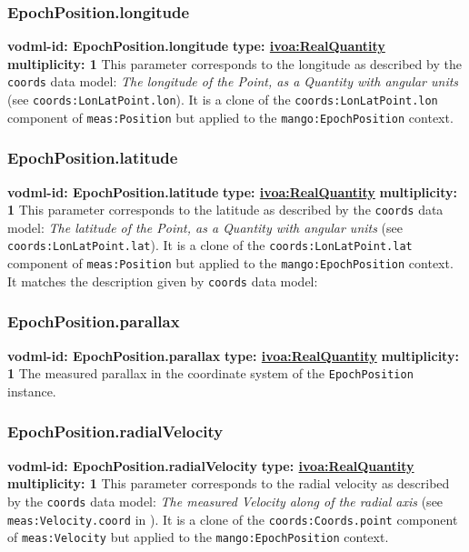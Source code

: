    \subsubsection{EpochPosition.longitude}
      \textbf{vodml-id: EpochPosition.longitude} \newline
      \textbf{type: \hyperref[sect:ivoa]{ivoa:RealQuantity}} \newline
      \textbf{multiplicity: 1} \newline
      This parameter corresponds to the longitude as described by the \texttt{coords} data model: \textit{The longitude of the Point, as a Quantity with angular units} (see \texttt{coords:LonLatPoint.lon}). It is a clone of the \texttt{coords:LonLatPoint.lon} component of \texttt{meas:Position} but applied to the \texttt{mango:EpochPosition} context.

    \subsubsection{EpochPosition.latitude}
      \textbf{vodml-id: EpochPosition.latitude} \newline
      \textbf{type: \hyperref[sect:ivoa]{ivoa:RealQuantity}} \newline
      \textbf{multiplicity: 1} \newline
      This parameter corresponds to the latitude as described by the \texttt{coords} data model: \textit{The latitude of the Point, as a Quantity with angular units} (see \texttt{coords:LonLatPoint.lat}). It is a clone of the \texttt{coords:LonLatPoint.lat} component of \texttt{meas:Position} but applied to the \texttt{mango:EpochPosition} context. It matches the description given by \texttt{coords} data model:

    \subsubsection{EpochPosition.parallax}
      \textbf{vodml-id: EpochPosition.parallax} \newline
      \textbf{type: \hyperref[sect:ivoa]{ivoa:RealQuantity}} \newline
      \textbf{multiplicity: 1} \newline
      The measured parallax in the coordinate system of the \texttt{EpochPosition} instance.

    \subsubsection{EpochPosition.radialVelocity}
      \textbf{vodml-id: EpochPosition.radialVelocity} \newline
      \textbf{type: \hyperref[sect:ivoa]{ivoa:RealQuantity}} \newline
      \textbf{multiplicity: 1} \newline
      This parameter corresponds to the radial velocity as described by the \texttt{coords} data model: \textit{The measured Velocity along of the radial axis } (see \texttt{meas:Velocity.coord} in \cite{2022ivoa.spec.1004R}). It is a clone of the \texttt{coords:Coords.point} component of \texttt{meas:Velocity} but applied to the \texttt{mango:EpochPosition} context.


